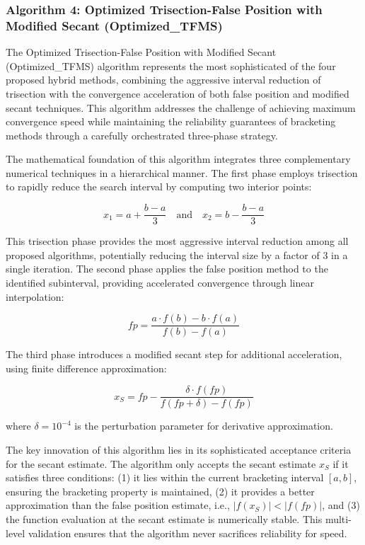 \documentclass[amsmath, amssymb, aps]{revtex4-2}
\begin{document}
\subsubsection{Algorithm 4: Optimized Trisection-False Position with Modified Secant (Optimized\_TFMS)}

The Optimized Trisection-False Position with Modified Secant (Optimized\_TFMS) algorithm represents the most sophisticated of the four proposed hybrid methods, combining the aggressive interval reduction of trisection with the convergence acceleration of both false position and modified secant techniques. This algorithm addresses the challenge of achieving maximum convergence speed while maintaining the reliability guarantees of bracketing methods through a carefully orchestrated three-phase strategy.

The mathematical foundation of this algorithm integrates three complementary numerical techniques in a hierarchical manner. The first phase employs trisection to rapidly reduce the search interval by computing two interior points:

\begin{equation}
x_1 = a + \frac{b - a}{3} \quad \text{and} \quad x_2 = b - \frac{b - a}{3}
\end{equation}

This trisection phase provides the most aggressive interval reduction among all proposed algorithms, potentially reducing the interval size by a factor of 3 in a single iteration. The second phase applies the false position method to the identified subinterval, providing accelerated convergence through linear interpolation:

\begin{equation}
fp = \frac{a \cdot f(b) - b \cdot f(a)}{f(b) - f(a)}
\end{equation}

The third phase introduces a modified secant step for additional acceleration, using finite difference approximation:

\begin{equation}
x_S = fp - \frac{\delta \cdot f(fp)}{f(fp + \delta) - f(fp)}
\end{equation}

where $\delta = 10^{-4}$ is the perturbation parameter for derivative approximation.

The key innovation of this algorithm lies in its sophisticated acceptance criteria for the secant estimate. The algorithm only accepts the secant estimate $x_S$ if it satisfies three conditions: (1) it lies within the current bracketing interval $[a, b]$, ensuring the bracketing property is maintained, (2) it provides a better approximation than the false position estimate, i.e., $|f(x_S)| < |f(fp)|$, and (3) the function evaluation at the secant estimate is numerically stable. This multi-level validation ensures that the algorithm never sacrifices reliability for speed.
\end{document}
